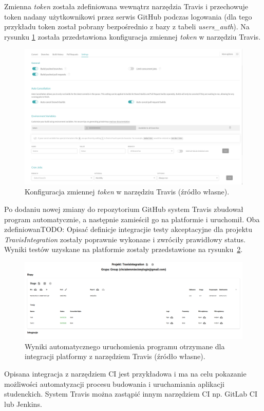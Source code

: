 Zmienna \textit{token} została zdefiniowana wewnątrz narzędzia Travis i przechowuje token nadany użytkownikowi przez serwis GitHub podczas logowania (dla tego przykładu token został pobrany bezpośrednio z bazy z tabeli \textit{users\_auth}).
Na rysunku \ref{fig:travis_integration_internal} została przedstawiona konfiguracja zmiennej \textit{token} w narzędziu Travis.

\begin{figure}[h]
    \centering
    \includegraphics[width = 12cm]{chapter05/travis_integration_internal.png}
    \caption{Konfiguracja zmiennej \textit{token} w narzędziu Travis (źródło własne).}
    \label{fig:travis_integration_internal}
\end{figure}

Po dodaniu nowej zmiany do repozytorium GitHub system Travis zbudował program automatycznie, a następnie zamieścił go na platformie i uruchomił.
Oba zdefiniowanTODO: Opisać definicje integracjie testy akceptacyjne dla projektu \textit{TravisIntegration} zostały poprawnie wykonane i zwróciły prawidłowy status.
Wyniki testów uzyskane na platformie zostały przedstawione na rysunku~\ref{fig:travis_integration_result}.

\begin{figure}[h]
    \centering
    \includegraphics[width = 12cm]{chapter05/travis_integration_result.png}
    \caption{Wyniki automatycznego uruchomienia programu otrzymane dla integracji platformy z narzędziem Travis (źródło własne).}
    \label{fig:travis_integration_result}
\end{figure}

Opisana integracja z narzędziem CI jest przykładowa i ma na celu pokazanie możliwości automatyzacji procesu budowania i uruchamiania aplikacji studenckich.
System Travis można zastąpić innym narzędziem CI np. GitLab CI lub Jenkins.